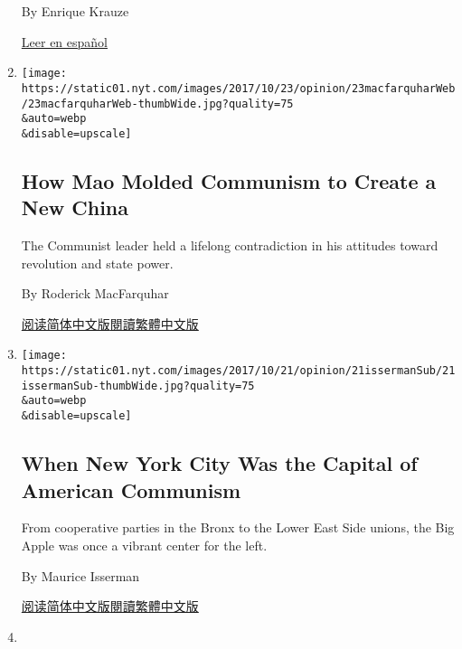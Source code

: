 \begin{enumerate}
  By Enrique Krauze

  \href{https://www.nytimes.com/es/2017/10/17/la-revolucion-domesticada}{Leer
  en español}
\item
  \href{/2017/10/23/opinion/how-mao-molded-communism-to-create-a-new-china.html}{}

  \texttt{[image: https://static01.nyt.com/images/2017/10/23/opinion/23macfarquharWeb/23macfarquharWeb-thumbWide.jpg?quality=75\\\&auto=webp\\\&disable=upscale]}

  \hypertarget{how-mao-molded-communism-to-create-a-new-china}{%
  \subsection{How Mao Molded Communism to Create a New
  China}\label{how-mao-molded-communism-to-create-a-new-china}}

  The Communist leader held a lifelong contradiction in his attitudes
  toward revolution and state power.

  By Roderick MacFarquhar

  \href{https://cn.nytimes.com/opinion/20171024/how-mao-molded-communism-to-create-a-new-china/}{阅读简体中文版}\href{https://cn.nytimes.com/opinion/20171024/how-mao-molded-communism-to-create-a-new-china/zh-hant/}{閱讀繁體中文版}
\item
  \href{/2017/10/20/opinion/new-york-american-communism.html}{}

  \texttt{[image: https://static01.nyt.com/images/2017/10/21/opinion/21issermanSub/21issermanSub-thumbWide.jpg?quality=75\\\&auto=webp\\\&disable=upscale]}

  \hypertarget{when-new-york-city-was-the-capital-of-american-communism}{%
  \subsection{When New York City Was the Capital of American
  Communism}\label{when-new-york-city-was-the-capital-of-american-communism}}

  From cooperative parties in the Bronx to the Lower East Side unions,
  the Big Apple was once a vibrant center for the left.

  By Maurice Isserman

  \href{http://cn.nytimes.com/opinion/20171023/new-york-american-communism/}{阅读简体中文版}\href{http://cn.nytimes.com/opinion/20171023/new-york-american-communism/zh-hant/}{閱讀繁體中文版}
\item
  \href{/2017/10/16/opinion/john-reed-russian-revolution-journalism.html}{}


\end{enumerate}
